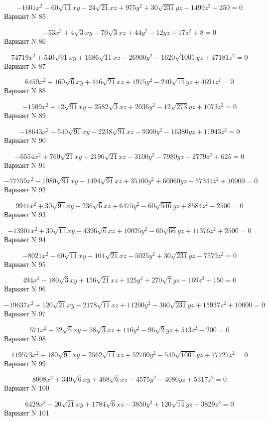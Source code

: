 \documentclass[11pt]{report}
\begin{document}
$$- 1601 x^{2} - 60 \sqrt{11} x y - 24 \sqrt{21} x z + 975 y^{2} + 30 \sqrt{231} y z - 1499 z^{2} + 250 = 0$$Вариант N 85

$$- 53 x^{2} + 4 \sqrt{3} x y - 70 \sqrt{3} x z + 44 y^{2} - 12 y z + 17 z^{2} + 8 = 0$$Вариант N 86

$$74719 x^{2} + 540 \sqrt{91} x y + 1686 \sqrt{11} x z - 26900 y^{2} - 1620 \sqrt{1001} y z + 47181 z^{2} = 0$$Вариант N 87

$$6459 x^{2} + 160 \sqrt{6} x y + 416 \sqrt{21} x z + 1975 y^{2} - 240 \sqrt{14} y z + 4691 z^{2} = 0$$Вариант N 88

$$- 1509 x^{2} + 12 \sqrt{91} x y - 2582 \sqrt{3} x z + 2036 y^{2} - 12 \sqrt{273} y z + 1073 z^{2} = 0$$Вариант N 89

$$- 18643 x^{2} + 540 \sqrt{91} x y - 2238 \sqrt{91} x z - 9300 y^{2} - 16380 y z + 11943 z^{2} = 0$$Вариант N 90

$$- 6554 x^{2} + 760 \sqrt{21} x y - 2196 \sqrt{21} x z - 3100 y^{2} - 7980 y z + 2779 z^{2} + 625 = 0$$Вариант N 91

$$- 77759 x^{2} - 1980 \sqrt{91} x y - 1494 \sqrt{91} x z + 35100 y^{2} + 60060 y z - 57341 z^{2} + 10000 = 0$$Вариант N 92

$$9941 x^{2} + 30 \sqrt{91} x y + 236 \sqrt{6} x z + 6475 y^{2} - 60 \sqrt{546} y z + 8584 z^{2} - 2500 = 0$$Вариант N 93

$$- 13901 x^{2} + 30 \sqrt{11} x y - 4396 \sqrt{6} x z + 10025 y^{2} - 60 \sqrt{66} y z + 11376 z^{2} + 2500 = 0$$Вариант N 94

$$- 8021 x^{2} - 60 \sqrt{11} x y - 104 \sqrt{21} x z - 5025 y^{2} + 30 \sqrt{231} y z - 7579 z^{2} = 0$$Вариант N 95

$$494 x^{2} - 180 \sqrt{3} x y + 156 \sqrt{21} x z + 125 y^{2} + 270 \sqrt{7} y z - 169 z^{2} + 150 = 0$$Вариант N 96

$$- 19637 x^{2} + 120 \sqrt{21} x y - 2178 \sqrt{11} x z + 11200 y^{2} - 360 \sqrt{231} y z + 15937 z^{2} + 10000 = 0$$Вариант N 97

$$571 x^{2} + 32 \sqrt{6} x y + 58 \sqrt{3} x z + 116 y^{2} - 96 \sqrt{2} y z + 513 z^{2} - 200 = 0$$Вариант N 98

$$119573 x^{2} + 180 \sqrt{91} x y + 2562 \sqrt{11} x z + 52700 y^{2} - 540 \sqrt{1001} y z + 77727 z^{2} = 0$$Вариант N 99

$$8008 x^{2} + 340 \sqrt{6} x y + 468 \sqrt{6} x z - 4575 y^{2} - 4080 y z + 5317 z^{2} = 0$$Вариант N 100

$$6429 x^{2} - 20 \sqrt{21} x y + 1784 \sqrt{6} x z - 3850 y^{2} + 120 \sqrt{14} y z - 3829 z^{2} = 0$$Вариант N 101
\end{document}
